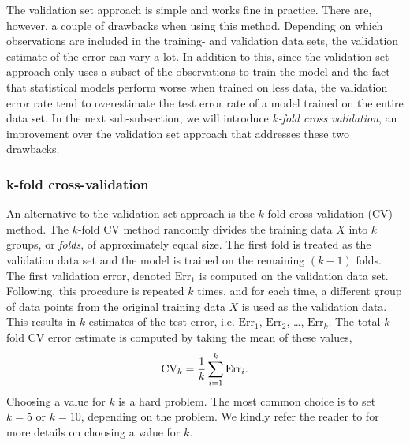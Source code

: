 The validation set approach is simple and works fine in practice. There are, however, a couple of drawbacks when using this method. Depending on which observations are included in the training- and validation data sets, the validation estimate of the error can vary a lot. In addition to this, since the validation set approach only uses a subset of the observations to train the model and the fact that statistical models perform worse when trained on less data, the validation error rate tend to overestimate the test error rate of a model trained on the entire data set. In the next sub-subsection, we will introduce \textit{$k$-fold cross validation}, an improvement over the validation set approach that addresses these two drawbacks.

\subsubsection{k-fold cross-validation}
\label{sec:cross-validation}
An alternative to the validation set approach is the $k$-fold cross validation (CV) method. The $k$-fold CV method randomly divides the training data $X$ into $k$ groups, or \textit{folds}, of approximately equal size. The first fold is treated as the validation data set and the model is trained on the remaining $(k - 1)$ folds. The first validation error, denoted $\text{Err}_1$ is computed on the validation data set. Following, this procedure is repeated $k$ times, and for each time, a different group of data points from the original training data $X$ is used as the validation data. This results in $k$ estimates of the test error, i.e. $\text{Err}_1$, $\text{Err}_2$, \ldots, $\text{Err}_k$. The total $k$-fold CV error estimate is computed by taking the mean of these values,
\begin{align}
    \text{CV}_k = \frac{1}{k} \sum\limits_{i=1}^{k} \text{Err}_i.
\end{align}
Choosing a value for $k$ is a hard problem. The most common choice is to set $k=5$ or $k=10$, depending on the problem. We kindly refer the reader to \cite[Section 5.1.4]{James2013} for more details on choosing a value for $k$.

